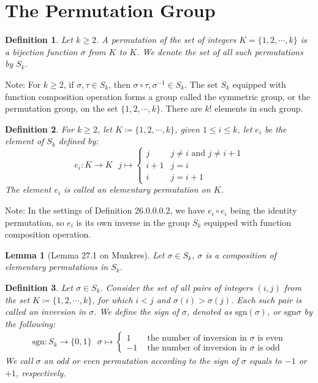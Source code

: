 \documentclass[15pt]{book}
\theoremstyle{break}
\theoremstyle{break}
\newtheorem{lem}{Lemma}[thm]
\newtheorem{defn}{Definition}[corL]
\newcommand{\sgn}{\text{sgn}}
\newcommand{\note}{\color{red}Note: \color{black}}
\begin{document}
\newpage
\section[The Permutation Group]{\color{red}The Permutation Group \color{black}}
\begin{defn}
Let $k \geq 2$. A permutation of the set of integers $K= \{1 , 2,\cdots, k\}$ is a bijection function $\sigma$ from $K$ to $K$. We denote the set of all such permutations by $S_k$. 
\end{defn}

\note For $k\geq 2$, if $\sigma, \tau \in S_k$, then $\sigma\circ \tau ,  \sigma^{-1} \in S_k$. The set $S_k$ equipped with function composition operation forms a group called the symmetric group, or the permutation group, on the set $\{1, 2,\cdots, k\}$. There are $k!$ elements in such group. \\

\begin{defn}
For $k\geq 2$, let $K \coloneqq \{ 1,2,\cdots, k\}$, given $1 \leq i \leq k$, let $e_i$ be the element of $S_k$ defined by: 
$$e_i : K \to K \ \ \ j \mapsto \begin{cases} j & j\neq i \text{ and } j\neq i+1\\
i+1 & j=i \\
i & j=i+1
\end{cases}$$
The element $e_i$ is called an elementary permutation on $K$. 
\end{defn}

\note In the settings of Definition 26.0.0.0.2, we have $e_i \circ e_i$ being the identity permutation, so $e_i$ is its own inverse in the group $S_k$ equipped with function composition operation. \\

\begin{lem}[Lemma 27.1 on Munkres]
Let $\sigma \in S_k$, $\sigma$ is a composition of elementary permutations in $S_k$. 
\end{lem}

\begin{defn}
Let $\sigma \in S_k$. Consider the set of all pairs of integers $(i, j)$ from the set $K \coloneqq \{1,2,\cdots, k\}$, for which $i<j$ and $\sigma(i) > \sigma(j)$. Each such pair is called an inversion in $\sigma$. We define the sign of $\sigma$, denoted as $\sgn(\sigma)$, or $\sgn \sigma$ by the following:
\begin{align*}
\sgn: S_k \to \{0,1\} \ \ \ \sigma\mapsto \begin{cases}
1 & \text{ the number of inversion in }\sigma \text{ is even}\\
-1 & \text{ the number of inversion in }\sigma \text{ is odd}
\end{cases}
\end{align*}
We call $\sigma$ an odd or even permutation according to the sign of $\sigma$ equals to $-1$ or $+1$, respectively. 
\end{defn}
\end{document}
